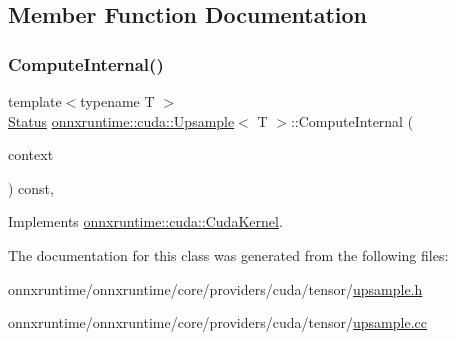 \subsection{Member Function Documentation}
\mbox{\label{classonnxruntime_1_1cuda_1_1Upsample_a78a79ebb66c859d3c6f97dde1e7ec4f0}} 
\subsubsection{\texorpdfstring{Compute\+Internal()}{ComputeInternal()}}
{\footnotesize\ttfamily template$<$typename T $>$ \\
\mbox{\hyperlink{classonnxruntime_1_1common_1_1Status}{Status}} \mbox{\hyperlink{classonnxruntime_1_1cuda_1_1Upsample}{onnxruntime\+::cuda\+::\+Upsample}}$<$ T $>$\+::Compute\+Internal (\begin{DoxyParamCaption}\item[{\mbox{\hyperlink{classonnxruntime_1_1OpKernelContext}{Op\+Kernel\+Context}} $\ast$}]{context }\end{DoxyParamCaption}) const\hspace{0.3cm}{\ttfamily [override]}, {\ttfamily [virtual]}}



Implements \mbox{\hyperlink{classonnxruntime_1_1cuda_1_1CudaKernel_aca7af04ae448017d6023d30bba231ebb}{onnxruntime\+::cuda\+::\+Cuda\+Kernel}}.



The documentation for this class was generated from the following files\+:\begin{DoxyCompactItemize}
\item 
onnxruntime/onnxruntime/core/providers/cuda/tensor/\mbox{\hyperlink{cuda_2tensor_2upsample_8h}{upsample.\+h}}\item 
onnxruntime/onnxruntime/core/providers/cuda/tensor/\mbox{\hyperlink{cuda_2tensor_2upsample_8cc}{upsample.\+cc}}\end{DoxyCompactItemize}
